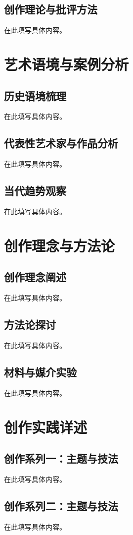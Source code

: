 \documentclass[a4paper,12pt,openright]{ctexrep}
\begin{document}
\section{创作理论与批评方法}
在此填写具体内容。


\chapter{艺术语境与案例分析}
\section{历史语境梳理}
在此填写具体内容。

\section{代表性艺术家与作品分析}
在此填写具体内容。

\section{当代趋势观察}
在此填写具体内容。


\chapter{创作理念与方法论}
\section{创作理念阐述}
在此填写具体内容。

\section{方法论探讨}
在此填写具体内容。

\section{材料与媒介实验}
在此填写具体内容。


\chapter{创作实践详述}
\section{创作系列一：主题与技法}
在此填写具体内容。

\section{创作系列二：主题与技法}
在此填写具体内容。
\end{document}
